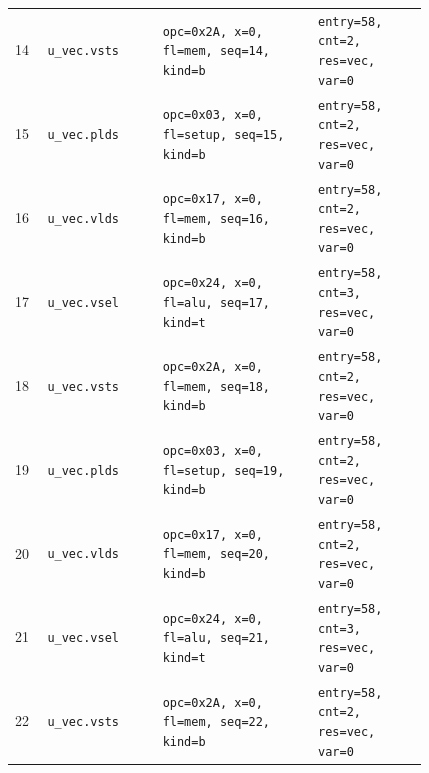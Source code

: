 {\begin{longtable}{@{}R{0.055\linewidth}L{0.23\linewidth}L{0.31\linewidth}L{0.22\linewidth}@{}}
14 & \texttt{u\_vec.vsts} & \texttt{opc=0x2A, x=0, fl=mem, seq=14, kind=b} & \texttt{entry=58, cnt=2, res=vec, var=0} \\
15 & \texttt{u\_vec.plds} & \texttt{opc=0x03, x=0, fl=setup, seq=15, kind=b} & \texttt{entry=58, cnt=2, res=vec, var=0} \\
16 & \texttt{u\_vec.vlds} & \texttt{opc=0x17, x=0, fl=mem, seq=16, kind=b} & \texttt{entry=58, cnt=2, res=vec, var=0} \\
17 & \texttt{u\_vec.vsel} & \texttt{opc=0x24, x=0, fl=alu, seq=17, kind=t} & \texttt{entry=58, cnt=3, res=vec, var=0} \\
18 & \texttt{u\_vec.vsts} & \texttt{opc=0x2A, x=0, fl=mem, seq=18, kind=b} & \texttt{entry=58, cnt=2, res=vec, var=0} \\
19 & \texttt{u\_vec.plds} & \texttt{opc=0x03, x=0, fl=setup, seq=19, kind=b} & \texttt{entry=58, cnt=2, res=vec, var=0} \\
20 & \texttt{u\_vec.vlds} & \texttt{opc=0x17, x=0, fl=mem, seq=20, kind=b} & \texttt{entry=58, cnt=2, res=vec, var=0} \\
21 & \texttt{u\_vec.vsel} & \texttt{opc=0x24, x=0, fl=alu, seq=21, kind=t} & \texttt{entry=58, cnt=3, res=vec, var=0} \\
22 & \texttt{u\_vec.vsts} & \texttt{opc=0x2A, x=0, fl=mem, seq=22, kind=b} & \texttt{entry=58, cnt=2, res=vec, var=0} \\
\bottomrule
\end{longtable}
}
